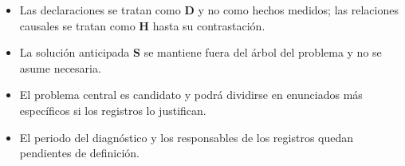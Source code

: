 	\begin{itemize}
		\item Las declaraciones se tratan como \textbf{D} y no como hechos medidos; las relaciones causales se tratan como \textbf{H} hasta su contrastación.
		\item La solución anticipada \textbf{S} se mantiene fuera del árbol del problema y no se asume necesaria.
		\item El problema central es candidato y podrá dividirse en enunciados más específicos si los registros lo justifican.
		\item El periodo del diagnóstico y los responsables de los registros quedan pendientes de definición.
	\end{itemize}
